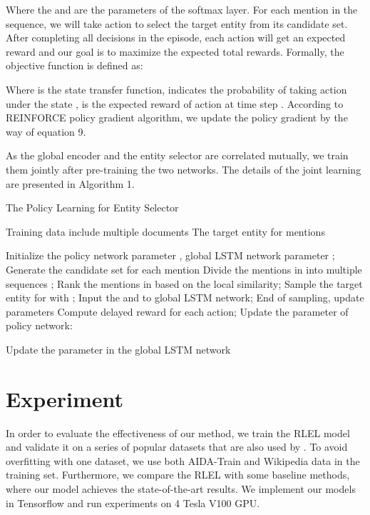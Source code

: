 \documentclass[sigconf]{acmart}
\begin{document}
Where the  and  are the parameters of the softmax layer. For each mention in the sequence, we will take action to select the target entity from its candidate set. After completing all decisions in the episode, each action will get an expected reward and our goal is to maximize the expected total rewards. Formally, the objective function is defined as:

Where  is the state transfer function,  indicates the probability of taking action  under the state ,  is the expected reward of action  at time step . According to REINFORCE policy gradient algorithm\cite{Williams92}, we update the policy gradient by the way of equation 9. 

As the global encoder and the entity selector are correlated mutually, we train them jointly after pre-training the two networks. The details of the joint learning are presented in Algorithm 1.
 
\begin{algorithm}[t]
\caption{The Policy Learning for Entity Selector}
\begin{algorithmic}[1]
\REQUIRE Training data include multiple documents 
\ENSURE The target entity for mentions  

\STATE Initialize the policy network parameter , global LSTM network parameter ;
\STATE Generate the candidate set for each mention
\STATE Divide the mentions in  into multiple sequences ;
\STATE Rank the mentions  in  based on the local similarity;
\STATE Sample the target entity  for  with ;
\STATE Input the  and  to global LSTM network;
\ENDFOR
\STATE  End of sampling, update parameters 
\STATE Compute delayed reward  for each action;
\STATE Update the parameter  of policy network:\\
\qquad 

\ENDFOR
\STATE Update the parameter  in the global LSTM network\\
\ENDFOR
\end{algorithmic}
\end{algorithm}

\section{Experiment}
In order to evaluate the effectiveness of our method, we train the RLEL model and validate it on a series of popular datasets that are also used by \cite{GaneaH17, TitovL18a}. To avoid overfitting with one dataset, we use both  AIDA-Train and Wikipedia data in the training set. Furthermore, we compare the RLEL with some baseline methods, where our model achieves the state-of-the-art results. We implement our models in Tensorflow and run experiments on 4 Tesla V100 GPU. 
\end{document}
